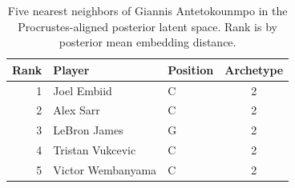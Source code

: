 \begin{table}[htbp]
  \centering\small
  \begin{tabular}{rllc}
    \toprule
    Rank & Player & Position & Archetype \\
    \midrule
    1 & Joel Embiid & C & 2 \\
    2 & Alex Sarr & C & 2 \\
    3 & LeBron James & G & 2 \\
    4 & Tristan Vukcevic & C & 2 \\
    5 & Victor Wembanyama & C & 2 \\
    \bottomrule
  \end{tabular}
  \caption{Five nearest neighbors of Giannis Antetokounmpo in the Procrustes-aligned posterior latent space. Rank is by posterior mean embedding distance.}
  \label{tab:Giannis_Antetokounmpo_neighbors}
\end{table}

